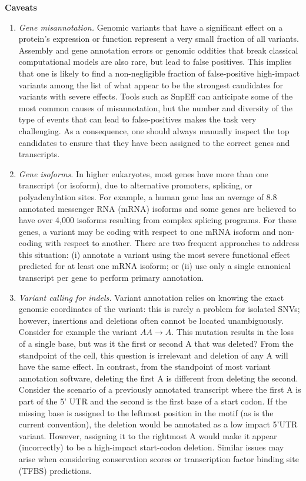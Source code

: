 \textbf{Caveats}
	\begin{enumerate}[label=\roman*]
	
	\item \textit{Gene misannotation.} Genomic variants that have a significant effect on a protein's expression or function represent a very small fraction of all variants. Assembly and gene annotation errors or genomic oddities that break classical computational models are also rare, but lead to false positives. This implies that one is likely to find a non-negligible fraction of false-positive high-impact variants among the list of what appear to be the strongest candidates for variants with severe effects. Tools such as SnpEff can anticipate some of the most common causes of misannotation, but the number and diversity of the type of events that can lead to false-positives makes the task very challenging. As a consequence, one should always manually inspect the top candidates to ensure that they have been assigned to the correct genes and transcripts.
	
	\item \textit{Gene isoforms.} In higher eukaryotes, most genes have more than one transcript (or isoform), due to alternative promoters, splicing, or polyadenylation sites. For example, a human gene has an average of 8.8 annotated messenger RNA (mRNA) isoforms and some genes are believed to have over 4,000 isoforms resulting from complex splicing programs. For these genes, a variant may be coding with respect to one mRNA isoform and non-coding with respect to another. There are two frequent approaches to address this situation: (i) annotate a variant using the most severe functional effect predicted for at least one mRNA isoform; or (ii) use only a single canonical transcript per gene to perform primary annotation. 
	
	\item \textit{Variant calling for indels.} Variant annotation relies on knowing the exact genomic coordinates of the variant: this is rarely a problem for isolated SNVs; however, insertions and deletions often cannot be located unambiguously. Consider for example the variant $AA \rightarrow A$. This mutation results in the loss of a single base, but was it the first or second A that was deleted? From the standpoint of the cell, this question is irrelevant and deletion of any A will have the same effect. In contrast, from the standpoint of most variant annotation software, deleting the first A is different from deleting the second. Consider the scenario of a previously annotated transcript where the first A is part of the 5' UTR and the second is the first base of a start codon. If the missing base is assigned to the leftmost position in the motif (as is the current convention), the deletion would be annotated as a low impact 5'UTR variant. However, assigning it to the rightmost A would make it appear (incorrectly) to be a high-impact start-codon deletion. Similar issues may arise when considering conservation scores or transcription factor binding site (TFBS) predictions.
	
		\end{enumerate}

